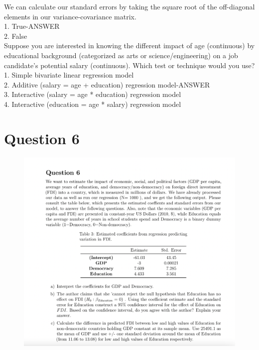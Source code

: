\documentclass[12pt,letterpaper]{article}
\begin{document}
	We can calculate our standard errors by taking the square root of the off-diagonal elements
	in our variance-covariance matrix.\\
	1. True-ANSWER\\
	2. False\\
	
	Suppose you are interested in knowing the different impact of age (continuous) by educational
	background (categorized as arts or science/engineering) on a job candidate’s potential salary
	(continuous). Which test or technique would you use?\\
	1. Simple bivariate linear regression model\\
	2. Additive (salary = age + education) regression model-ANSWER\\
	3. Interactive (salary = age * education) regression model\\
	4. Interactive (education = age * salary) regression model\\
	
	
	
	
	\vspace{.5cm}

		\section*{Question 6}
	\vspace{.25cm}
	\noindent 
\begin{figure}[H]
\centering
\includegraphics[width=0.7\linewidth]{Q6}
\caption{}
\label{fig:q6}
\end{figure}
\end{document}
